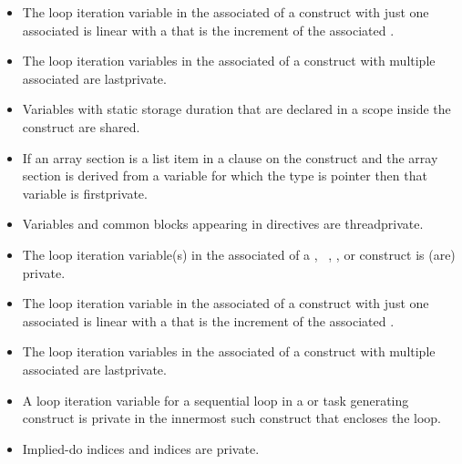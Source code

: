 {{{{\begin{itemize}
\item The loop iteration variable in the associated  of a  construct with just 
one associated  is linear with a  that is the increment of
the associated .

\item The loop iteration variables in the associated  of a  construct with 
multiple associated  are lastprivate. 

\pagebreak

\item Variables with static storage duration that are declared in a scope inside the construct 
are shared.

\item If an array section is a list item in a  clause on the  construct and the array section is derived from a variable for which the type is pointer then that variable is firstprivate. 
\end{itemize}
\ccppspecificend

\fortranspecificstart
\begin{itemize}
\item Variables and common blocks appearing in  directives are 
threadprivate. 

\item The loop iteration variable(s) in the associated  of a , ~,
, or  construct is (are) private.

\item The loop iteration variable in the associated  of a  construct with just 
one associated  is linear with a  that is the increment of
the associated .

\item The loop iteration variables in the associated  of a  construct with 
multiple associated  are lastprivate. 

\item A loop iteration variable for a sequential loop in a  or task generating construct is 
private in the innermost such construct that encloses the loop.

\item Implied-do indices and  indices are private. 


\end{itemize}}}}}
